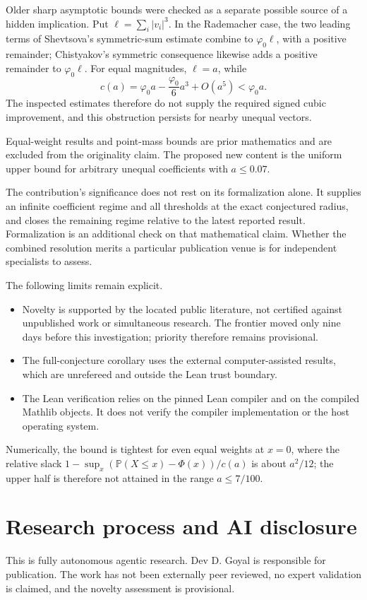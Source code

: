 \documentclass[11pt]{article}
\newcommand{\Pp}{\mathbb P}
\newcommand{\phz}{\varphi_0}
\begin{document}
Older sharp asymptotic bounds were checked as a separate possible source
of a hidden implication. Put $\ell=\sum_i|v_i|^3$. In the Rademacher case,
the two leading terms of Shevtsova's symmetric-sum estimate \cite{Sh}
combine to $\phz\ell$, with a positive remainder; Chistyakov's symmetric
consequence \cite{Ch} likewise adds a positive remainder to $\phz\ell$.
For equal magnitudes, $\ell=a$, while
\[
 c(a)=\phz a-\frac{\phz}{6}a^3+O(a^5)<\phz a.
\]
The inspected estimates therefore do not supply the required signed cubic
improvement, and this obstruction persists for nearby unequal vectors.

Equal-weight results and point-mass bounds are prior mathematics and are
excluded from the originality claim. The proposed new content is the uniform upper
bound for arbitrary unequal coefficients with $a\le0.07$.

The contribution's significance does not rest on its formalization alone.
It supplies an infinite coefficient regime and all thresholds at the exact
conjectured radius, and closes the remaining regime relative to the latest
reported result. Formalization is an additional check on that mathematical
claim. Whether the combined resolution merits a particular publication venue
is for independent specialists to assess.

The following limits remain explicit.
\begin{itemize}
\item Novelty is supported by the located public literature, not certified
against unpublished work or simultaneous research. The frontier moved only
nine days before this investigation; priority therefore remains provisional.
\item The full-conjecture corollary uses the external computer-assisted
results, which are unrefereed and outside the Lean trust boundary.
\item The Lean verification relies on the pinned Lean compiler and on the
compiled Mathlib objects. It does not verify the compiler implementation or
the host operating system.
\end{itemize}

Numerically, the bound is tightest for even equal weights at $x=0$, where the
relative slack $1-\sup_x(\Pp(X\le x)-\Phi(x))/c(a)$ is about $a^2/12$; the
upper half is therefore not attained in the range $a\le7/100$.

\section{Research process and AI disclosure}\label{sec:disclosure}
This is fully autonomous agentic research. Dev D. Goyal is responsible for
publication. The work has not been externally peer reviewed, no expert
validation is claimed, and the novelty assessment is provisional.
\end{document}
